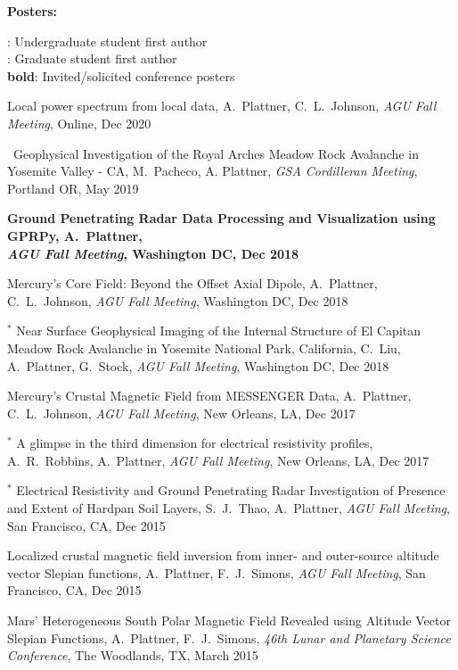 \documentclass[10pt]{article}
\begin{document}



\spc
\textbf{\tsize Posters:}

\spcp
\ug: Undergraduate student first author\\
\gr: Graduate student first author\\
\textbf{bold}: Invited/solicited conference posters

\spcp
Local power spectrum from local data,
A.~Plattner, C.~L.~Johnson, 
\emph{AGU Fall Meeting}, Online, Dec 2020 

\spcp
\hspace*{-0.4cm} \gr \, Geophysical Investigation of the Royal Arches Meadow Rock
Avalanche in Yosemite Valley - CA,
M.~Pacheco, A. Plattner,
\emph{GSA Cordilleran Meeting}, Portland OR, May 2019

\spcp
\textbf{Ground Penetrating Radar Data Processing and Visualization using
GPRPy,
A.~Plattner,\\
\emph{AGU Fall Meeting}, Washington DC, Dec 2018}

\spcp
Mercury's Core Field: Beyond the Offset Axial Dipole,
A.~Plattner, C.~L.~Johnson, 
\emph{AGU Fall Meeting}, Washington DC, Dec 2018 

\spcp
\hspace{-0.4cm} $^*$ Near Surface Geophysical Imaging of the Internal
Structure of El Capitan Meadow Rock Avalanche in Yosemite National
Park, California,
C.~Liu, A.~Plattner, G.~Stock,
\emph{AGU Fall Meeting}, Washington DC, Dec 2018


\spcp
Mercury's Crustal Magnetic Field from MESSENGER Data,
 A.~Plattner, C.~L.~Johnson, 
\emph{AGU Fall Meeting}, New Orleans, LA, Dec 2017 

\spcp
\hspace{-0.4cm} $^*$ A glimpse in the third dimension for electrical
resistivity profiles,
A.~R.~Robbins, A.~Plattner,
\emph{AGU Fall Meeting}, New Orleans, LA, Dec 2017 

\spcp
\hspace{-0.4cm} $^*$ Electrical Resistivity and Ground Penetrating Radar 
Investigation of Presence and Extent of Hardpan Soil Layers,
 S.~J.~Thao, A.~Plattner,
\emph{AGU Fall Meeting}, San Francisco, CA, Dec 2015

\spcp
Localized crustal magnetic field inversion from inner- and outer-source altitude vector Slepian functions,
A.~Plattner,  F.~J.~Simons,
\emph{AGU Fall Meeting}, San Francisco, CA, Dec 2015

\spcp
Mars' Heterogeneous South Polar Magnetic Field Revealed using Altitude Vector Slepian Functions,
A.~Plattner,  F.~J.~Simons,
\emph{46th Lunar and Planetary Science Conference}, The Woodlands, TX, March 2015
\end{document}
